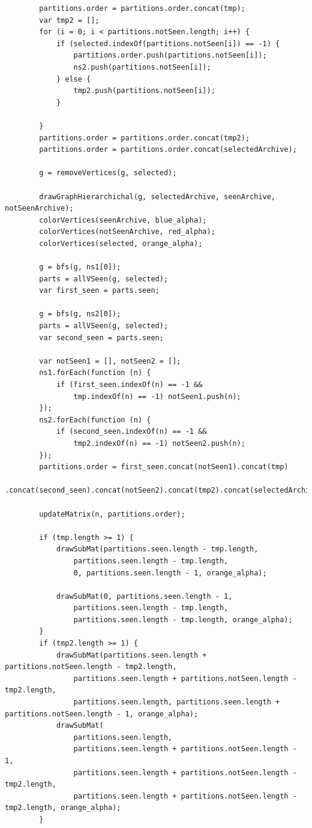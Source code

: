 \documentclass[12pt, twoside,a4paper,toc=bibliography]{scrbook}
\begin{document}
\begin{lstlisting}
        partitions.order = partitions.order.concat(tmp);
        var tmp2 = [];
        for (i = 0; i < partitions.notSeen.length; i++) {
            if (selected.indexOf(partitions.notSeen[i]) == -1) {
                partitions.order.push(partitions.notSeen[i]);
                ns2.push(partitions.notSeen[i]);
            } else {
                tmp2.push(partitions.notSeen[i]);
            }

        }
        partitions.order = partitions.order.concat(tmp2);
        partitions.order = partitions.order.concat(selectedArchive);

        g = removeVertices(g, selected);

        drawGraphHierarchichal(g, selectedArchive, seenArchive, notSeenArchive);
        colorVertices(seenArchive, blue_alpha);
        colorVertices(notSeenArchive, red_alpha);
        colorVertices(selected, orange_alpha);

        g = bfs(g, ns1[0]);
        parts = allVSeen(g, selected);
        var first_seen = parts.seen;

        g = bfs(g, ns2[0]);
        parts = allVSeen(g, selected);
        var second_seen = parts.seen;

        var notSeen1 = [], notSeen2 = [];
        ns1.forEach(function (n) {
            if (first_seen.indexOf(n) == -1 &&
                tmp.indexOf(n) == -1) notSeen1.push(n);
        });
        ns2.forEach(function (n) {
            if (second_seen.indexOf(n) == -1 &&
                tmp2.indexOf(n) == -1) notSeen2.push(n);
        });
        partitions.order = first_seen.concat(notSeen1).concat(tmp)
            .concat(second_seen).concat(notSeen2).concat(tmp2).concat(selectedArchive);

        updateMatrix(n, partitions.order);

        if (tmp.length >= 1) {
            drawSubMat(partitions.seen.length - tmp.length,
                partitions.seen.length - tmp.length,
                0, partitions.seen.length - 1, orange_alpha);

            drawSubMat(0, partitions.seen.length - 1,
                partitions.seen.length - tmp.length,
                partitions.seen.length - tmp.length, orange_alpha);
        }
        if (tmp2.length >= 1) {
            drawSubMat(partitions.seen.length + partitions.notSeen.length - tmp2.length,
                partitions.seen.length + partitions.notSeen.length - tmp2.length,
                partitions.seen.length, partitions.seen.length + partitions.notSeen.length - 1, orange_alpha);
            drawSubMat(
                partitions.seen.length,
                partitions.seen.length + partitions.notSeen.length - 1,
                partitions.seen.length + partitions.notSeen.length - tmp2.length,
                partitions.seen.length + partitions.notSeen.length - tmp2.length, orange_alpha);
        }


\end{lstlisting}
\end{document}
